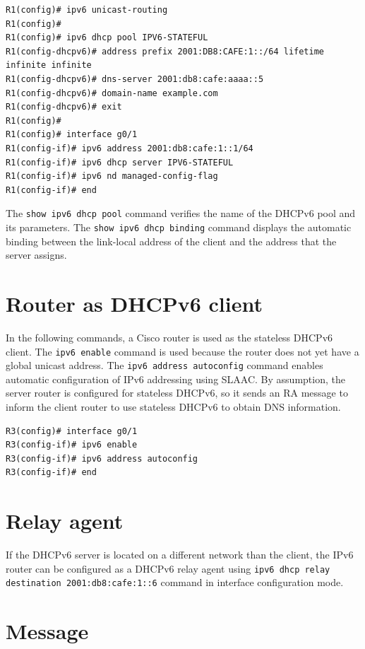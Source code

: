 \begin{verbatim}
R1(config)# ipv6 unicast-routing
R1(config)#
R1(config)# ipv6 dhcp pool IPV6-STATEFUL
R1(config-dhcpv6)# address prefix 2001:DB8:CAFE:1::/64 lifetime infinite infinite
R1(config-dhcpv6)# dns-server 2001:db8:cafe:aaaa::5
R1(config-dhcpv6)# domain-name example.com
R1(config-dhcpv6)# exit
R1(config)#
R1(config)# interface g0/1
R1(config-if)# ipv6 address 2001:db8:cafe:1::1/64
R1(config-if)# ipv6 dhcp server IPV6-STATEFUL
R1(config-if)# ipv6 nd managed-config-flag
R1(config-if)# end
\end{verbatim}

The \verb|show ipv6 dhcp pool| command verifies the name of the DHCPv6 pool and its parameters. The \verb|show ipv6 dhcp binding| command displays the automatic binding between the link-local address of the client and the address that the server assigns. 

\section{Router as DHCPv6 client}

In the following commands, a Cisco router is used as the stateless DHCPv6 client. The \verb|ipv6 enable| command is used because the router does not yet have a global unicast address. The \verb|ipv6 address autoconfig| command enables automatic configuration of IPv6 addressing using SLAAC. By assumption, the server router is configured for stateless DHCPv6, so it sends an RA message to inform the client router to use stateless DHCPv6 to obtain DNS information.

\begin{verbatim}
R3(config)# interface g0/1
R3(config-if)# ipv6 enable
R3(config-if)# ipv6 address autoconfig
R3(config-if)# end
\end{verbatim}

\section{Relay agent}

If the DHCPv6 server is located on a different network than the client, the IPv6 router can be configured as a DHCPv6 relay agent using \verb|ipv6 dhcp relay destination 2001:db8:cafe:1::6| command in interface configuration mode.

\section{Message}

